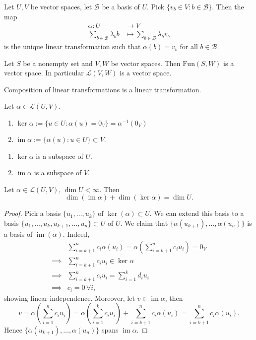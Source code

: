 \documentclass{scrartcl}
\def\L{\mathcal{L}}
\def\B{\mathcal{B}}
\DeclareMathOperator{\im}{im}
\begin{document}
\begin{remark}
	Let $U, V$ be vector spaces, let $\B$ be a basis of $U$. Pick $\{v_b \in V: b\in \B\}$. Then the map
	\begin{align*}
		\alpha: U &\to V \\
		\sum_{b\in \B} \lambda_b b &\mapsto \sum_{b\in \B} \lambda_b v_b
	\end{align*}
	is the unique linear transformation such that $\alpha(b) = v_b$ for all $b\in \B$. 
\end{remark}
\begin{proposition}
	Let $S$ be a nonempty set and $V, W$ be vector spaces. Then $\text{Fun}(S, W)$ is a vector space. In particular $\L(V, W)$ is a vector space.
\end{proposition}
\begin{lemma}
	Composition of linear transformations is a linear transformation. 
\end{lemma}
\begin{definition}
	Let $\alpha \in \L(U, V)$. 
	\begin{enumerate}
		\item $\ker{\alpha} := \{u \in U: \alpha(u)=0_V\} = \alpha^{-1}(0_V)$
		\item $\im{\alpha} := \{\alpha(u): u \in U\} \subset V$. 
	\end{enumerate}
\end{definition}
\begin{lemma}
	\begin{enumerate}
		\item $\ker{\alpha}$ is a subspace of $U$.
		\item $\im{\alpha}$ is a subspace of $V$.
	\end{enumerate}
\end{lemma}
\begin{theorem}
	Let $\alpha \in \L(U, V)$, $\dim{U} < \infty$. Then 
	\[\dim(\im{\alpha})+\dim(\ker{\alpha}) = \dim{U}.\]
\end{theorem}
\begin{proof}
	Pick a basis $\{u_1, \dots, u_k\}$ of $\ker(\alpha) \subset U$. We can extend this basis to a basis $\{u_1, \dots, u_k, u_{k+1}, \dots, u_n\} \subset U$ of $U$. We claim that $\{\alpha(u_{k+1}), \dots, \alpha(u_n)\}$ is a basis of $\im(\alpha)$. Indeed, 
	\begin{align*}
		&\sum_{i=k+1}^n c_i \alpha(u_i) = \alpha(\sum_{i=k+1}^n c_i u_i) = 0_V \\
		\implies &\sum_{i=k+1}^n c_i u_i \in \ker{\alpha} \\
		\implies &\sum_{i=k+1}^n c_i u_i = \sum_{i=1}^k d_i u_i \\
		\implies &c_i = 0 \, \forall i,
	\end{align*}
	showing linear independence. Moreover, let $v \in \im{\alpha}$, then 
	\[v = \alpha\left(\sum_{i=1}^n c_i u_i\right) = \alpha\left(\sum_{i=1}^k c_i u_i\right)+\sum_{i=k+1}^n c_i \alpha(u_i) = \sum_{i=k+1}^n c_i \alpha(u_i).\]
	Hence $\{\alpha(u_{k+1}), \dots, \alpha(u_n)\}$ spans $\im{\alpha}$.
\end{proof}
\end{document}
